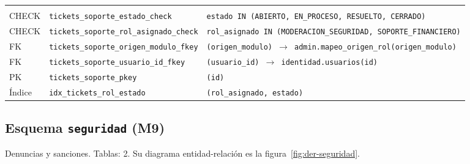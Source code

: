 {\small
\begin{xltabular}{\textwidth}{@{}>{\raggedright\arraybackslash}p{1.7cm} >{\raggedright\arraybackslash}p{4.6cm} L@{}}
    \toprule
     &  &  \\
    \midrule
    \endfirsthead
    \toprule
     &  &  \\
    \midrule
    \endhead
    \bottomrule
    \endfoot
    CHECK & \texttt{tickets\_\allowbreak{}soporte\_\allowbreak{}estado\_\allowbreak{}check} & \texttt{estado IN (\allowbreak{}\textquotesingle{}ABIERTO\textquotesingle{},\allowbreak{} \textquotesingle{}EN\_\allowbreak{}PROCESO\textquotesingle{},\allowbreak{} \textquotesingle{}RESUELTO\textquotesingle{},\allowbreak{} \textquotesingle{}CERRADO\textquotesingle{})} \\
    CHECK & \texttt{tickets\_\allowbreak{}soporte\_\allowbreak{}rol\_\allowbreak{}asignado\_\allowbreak{}check} & \texttt{rol\_\allowbreak{}asignado IN (\allowbreak{}\textquotesingle{}MODERACION\_\allowbreak{}SEGURIDAD\textquotesingle{},\allowbreak{} \textquotesingle{}SOPORTE\_\allowbreak{}FINANCIERO\textquotesingle{})} \\
    FK & \texttt{tickets\_\allowbreak{}soporte\_\allowbreak{}origen\_\allowbreak{}modulo\_\allowbreak{}fkey} & \texttt{(\allowbreak{}origen\_\allowbreak{}modulo) $\rightarrow$ admin.mapeo\_\allowbreak{}origen\_\allowbreak{}rol(\allowbreak{}origen\_\allowbreak{}modulo)} \\
    FK & \texttt{tickets\_\allowbreak{}soporte\_\allowbreak{}usuario\_\allowbreak{}id\_\allowbreak{}fkey} & \texttt{(\allowbreak{}usuario\_\allowbreak{}id) $\rightarrow$ identidad.usuarios(\allowbreak{}id)} \\
    PK & \texttt{tickets\_\allowbreak{}soporte\_\allowbreak{}pkey} & \texttt{(\allowbreak{}id)} \\
    Índice & \texttt{idx\_\allowbreak{}tickets\_\allowbreak{}rol\_\allowbreak{}estado} & \texttt{(\allowbreak{}rol\_\allowbreak{}asignado,\allowbreak{} estado)} \\
\end{xltabular}
}

\subsection{Esquema \texttt{seguridad} (M9)}\label{dd:seguridad}

Denuncias y sanciones. Tablas: 2. Su diagrama entidad-relación es la figura~\ref{fig:der-seguridad}.

